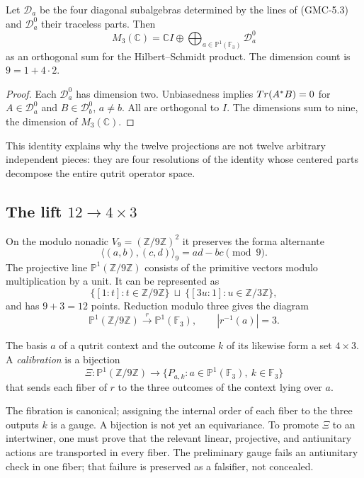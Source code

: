 \begin{proposition}
\label{p12-83-c22-s8:gmc:prop:descomposicion-masa-qutrit}
Let $\mathcal D_a$ be the four diagonal subalgebras determined by the
lines of \textup{(GMC-5.3)} and $\mathcal D_a^0$ their traceless parts. Then
\[
 M_3(\mathbb C)
 =\mathbb CI\oplus
   \bigoplus_{a\in\mathbb P^1(\mathbb F_3)}\mathcal D_a^0
 \tag{GMC-5.4}
\]
as an orthogonal sum for the Hilbert--Schmidt product. The dimension
count is $9=1+4\cdot2$.
\end{proposition}

\begin{proof}
Each $\mathcal D_a^0$ has dimension two. Unbiasedness implies
$Tr(A^*B)=0$ for $A\in\mathcal D_a^0$ and
$B\in\mathcal D_b^0$, $a\ne b$. All are orthogonal to $I$. The
dimensions sum to nine, the dimension of $M_3(\mathbb C)$.
\end{proof}

This identity explains why the twelve projections are not twelve arbitrary
independent pieces: they are four resolutions of the identity whose centered
parts decompose the entire qutrit operator space.

\subsection{The lift \texorpdfstring{$12\to4\times3$}{12 to 4 by 3}}

On the modulo nonadic $V_9=(\mathbb Z/9\mathbb Z)^2$ it preserves the forma
alternante
\[
 \langle(a,b),(c,d)\rangle_9=ad-bc\pmod9.
 \tag{GMC-5.5}
\]
The projective line $\mathbb P^1(\mathbb Z/9\mathbb Z)$ consists of
the primitive vectors modulo multiplication by a unit. It can
be represented as
\[
 \{[1:t]:t\in\mathbb Z/9\mathbb Z\}
 \ \sqcup\ 
 \{[3u:1]:u\in\mathbb Z/3\mathbb Z\},
 \tag{GMC-5.6}
\]
and has $9+3=12$ points. Reduction modulo three gives the diagram
\[
 \mathbb P^1(\mathbb Z/9\mathbb Z)
 \xrightarrow{\ r\ }
 \mathbb P^1(\mathbb F_3),
 \qquad |r^{-1}(a)|=3.
 \tag{GMC-5.7}
\]

The basis $a$ of a qutrit context and the outcome $k$
of its \PVM likewise form a set $4\times3$. A
\emph{calibration} is a bijection
\[
 \Xi:\mathbb P^1(\mathbb Z/9\mathbb Z)
 \longrightarrow
 \{P_{a,k}:a\in\mathbb P^1(\mathbb F_3),\ k\in\mathbb F_3\}
 \tag{GMC-5.8}
\]
that sends each fiber of $r$ to the three outcomes of the context lying over
$a$.

\begin{controlbox}
The fibration is canonical; assigning the internal order of each fiber to the
three outputs $k$ is a gauge. A bijection is not yet an
equivariance. To promote $\Xi$ to an intertwiner, one must prove that the
relevant linear, projective, and antiunitary actions are transported in
every fiber. The preliminary gauge fails an antiunitary check in one
fiber; that failure is preserved as a falsifier, not concealed.
\end{controlbox}

